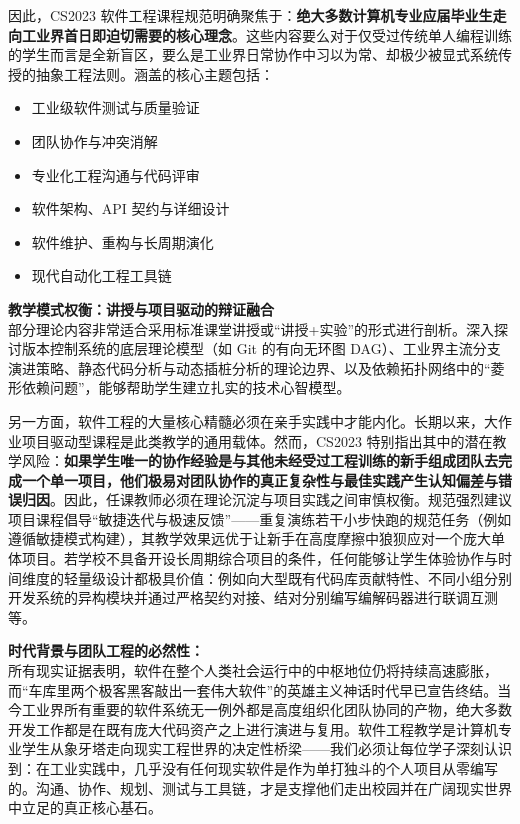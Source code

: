 \begin{preamblebox}[知识领域概述与时代演进]
因此，CS2023 软件工程课程规范明确聚焦于：\textbf{绝大多数计算机专业应届毕业生走向工业界首日即迫切需要的核心理念}。这些内容要么对于仅受过传统单人编程训练的学生而言是全新盲区，要么是工业界日常协作中习以为常、却极少被显式系统传授的抽象工程法则。涵盖的核心主题包括：
\begin{itemize}
    \item 工业级软件测试与质量验证
    \item 团队协作与冲突消解
    \item 专业化工程沟通与代码评审
    \item 软件架构、API 契约与详细设计
    \item 软件维护、重构与长周期演化
    \item 现代自动化工程工具链
\end{itemize}

\textbf{教学模式权衡：讲授与项目驱动的辩证融合}\\
部分理论内容非常适合采用标准课堂讲授或“讲授+实验”的形式进行剖析。深入探讨版本控制系统的底层理论模型（如 Git 的有向无环图 DAG）、工业界主流分支演进策略、静态代码分析与动态插桩分析的理论边界、以及依赖拓扑网络中的“菱形依赖问题”，能够帮助学生建立扎实的技术心智模型。

另一方面，软件工程的大量核心精髓必须在亲手实践中才能内化。长期以来，大作业项目驱动型课程是此类教学的通用载体。然而，CS2023 特别指出其中的潜在教学风险：\textbf{如果学生唯一的协作经验是与其他未经受过工程训练的新手组成团队去完成一个单一项目，他们极易对团队协作的真正复杂性与最佳实践产生认知偏差与错误归因}。因此，任课教师必须在理论沉淀与项目实践之间审慎权衡。规范强烈建议项目课程倡导“敏捷迭代与极速反馈”——重复演练若干小步快跑的规范任务（例如遵循敏捷模式构建），其教学效果远优于让新手在高度摩擦中狼狈应对一个庞大单体项目。若学校不具备开设长周期综合项目的条件，任何能够让学生体验协作与时间维度的轻量级设计都极具价值：例如向大型既有代码库贡献特性、不同小组分别开发系统的异构模块并通过严格契约对接、结对分别编写编解码器进行联调互测等。

\textbf{时代背景与团队工程的必然性：}\\
所有现实证据表明，软件在整个人类社会运行中的中枢地位仍将持续高速膨胀，而“车库里两个极客黑客敲出一套伟大软件”的英雄主义神话时代早已宣告终结。当今工业界所有重要的软件系统无一例外都是高度组织化团队协同的产物，绝大多数开发工作都是在既有庞大代码资产之上进行演进与复用。软件工程教学是计算机专业学生从象牙塔走向现实工程世界的决定性桥梁——我们必须让每位学子深刻认识到：在工业实践中，几乎没有任何现实软件是作为单打独斗的个人项目从零编写的。沟通、协作、规划、测试与工具链，才是支撑他们走出校园并在广阔现实世界中立足的真正核心基石。


\end{preamblebox}
